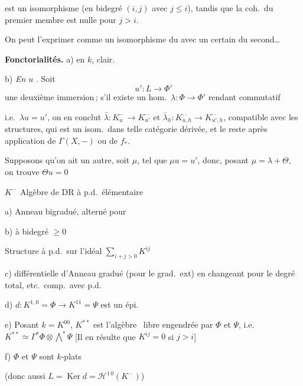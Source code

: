 \documentclass[11pt,a4paper]{article}
\begin{document}
est un isomorphisme  (en bidegré $(i,j)$ avec $j\leq i$),
tandis que la coh.\ du premier membre est nulle pour $j>i$.

On peut l'exprimer comme un isomorphisme du \ill{} avec un certain \ill{} du
second…

\textbf{Fonctorialités.} a) en $k$, clair.

b) \emph{En $u$} \struck{\ill{}}. Soit
\[
  u'\colon L\longrightarrow\Phi'
\]
une deuxième immersion\,; s'il existe un hom.\ $\lambda\colon\Phi\to\Phi'$
rendant commutatif


i.e.\ $\lambda u=u'$, on en conclut $\bar\lambda\colon K^{\cdot\cdot}_{u}\to
K^{\cdot\cdot}_{u'}$ et $\bar\lambda_{h}\colon K^{\cdot\cdot}_{u,h}\to
K^{\cdot\cdot}_{u',h}$, compatible avec les structures, qui est un isom.\ dans
telle catégorie dérivée, et le reste après application de $\Gamma(X,-)$ ou de
$f_{*}$.

Supposons qu'on ait un autre, soit $\mu$, tel que $\mu u=u'$, donc, posant
$\mu=\lambda+\Theta$, on trouve $\Theta u=0$

$K^{\cdot\cdot}$ \quad Algèbre de $\mathrm{DR}$ à p.d.\ élémentaire

a) Anneau bigradué, \struck{\ill{}} alterné pour 
\marginal{$\surd$}

b) \struck{\ill{}} à bidegré $\geq0$

\quad Structure à p.d.\ sur l'idéal $\sum\limits_{i+j>0}K^{ij}$

c) différentielle d'Anneau gradué (pour le grad.\ ext) en changeant pour le
degré total, etc.\ comp.\ avec p.d.

d) $d\colon K^{1,0}=\Phi\longrightarrow K^{11}=\Psi$ est un épi.

e) Posant $k=K^{00}$, $K^{**}$ est l'algèbre \ libre
engendrée par $\Phi$ et $\Psi$, i.e.\ $K^{**}\simeq\Gamma^{*}\Phi\otimes
\bigwedge^{*}\Psi$ [Il en résulte que $K^{ij}=0$ si $j>i$]

f)  $\Phi$ et $\Psi$ sont $k$-plats

(donc aussi $L=\operatorname{Ker}d=\mathcal{H}^{1\,0}(K^{\cdot\cdot})$)
\end{document}
